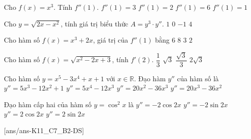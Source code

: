 \begin{ex}%
	Cho $f(x)=x^3$. Tính $f''(1)$.
	\choice
	{$f''(1)=3$}
	{$f''(1)=2$}
	{\True $f''(1)=6$}
	{$f''(1)=1$}
\end{ex}

\begin{ex}%
	Cho $ y=\sqrt{2x-x^2}$, tính giá trị biểu thức $ A=y^3\cdot y''$.
	\choice
	{$ 1$}
	{$ 0$}
	{\True $-1$}
	{$4$}
\end{ex}

\begin{ex}%
	Cho hàm số $ f(x)=x^3+2x$, giá trị của $f''(1)$ bằng
	\choice
	{\True $ 6$}
	{$ 8$}
	{$ 3$}
	{$ 2$}
\end{ex}

\begin{ex}%
	Cho hàm số $ f(x)=\sqrt{x^2-2 x+3}$, tính $f'(2)$.
	\choice
	{$\dfrac{1}{3}$}
	{$\sqrt{3}$}
	{\True $\dfrac{\sqrt{3}}{3}$}
	{$ 2\sqrt{3}$}
\end{ex}

\begin{ex}%
	Cho hàm số $ y=x^5-3x^4+x+1$ với $ x\in\mathbb{R}$. Đạo hàm $y''$ của hàm số là
	\choice
	{$y''=5x^3-12x^2+1$}
	{$y''=5x^4-12x^3$}
	{$y''=20x^2-36x^3$}
	{\True $y''=20x^3-36x^2$}
\end{ex}

\begin{ex}%
	Đạo hàm cấp hai của hàm số $y=\cos^2x$ là
	\choice
	{\True $y''=-2\cos 2x$}
	{$y''=-2\sin 2x$}
	{$y''=2\cos 2x$}
	{$y''=2\sin 2x$}
\end{ex}

\cauds
{}[ans/ans-K11_C7_B2-DS]

